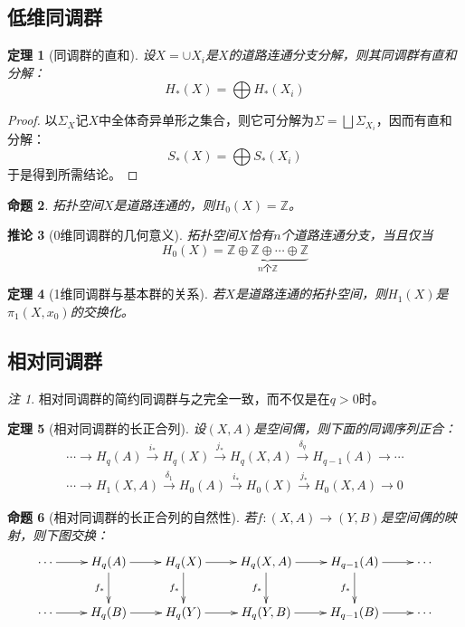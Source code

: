 \documentclass[UTF-8,11pt,fancyhdr,hyperref,titlepage]{ctexart}
\newcommand{\red}{\color{red}}
\theoremstyle{question}
\theoremstyle{theorem}
\newtheorem{thm}{定理}
\newtheorem{cor}[thm]{推论}
\newtheorem{prop}[thm]{命题}
\theoremstyle{definition}
\theoremstyle{remark}
\newtheorem*{rem}{注}
\def\ZZ{{\mathbb Z}}
\def\longto{\longrightarrow}
\def\To{\longto}
\newcommand{\markar}[1]{\stackrel{{#1}}{\longrightarrow}}%
\begin{document}
\subsection{低维同调群}
\begin{thm}[{{\red 同调群的直和}}]
  设$X=\cup X_i$是$X$的道路连通分支分解，则其同调群有直和分解：
  \begin{equation*}
    H_{\ast}(X)=\bigoplus H_{\ast}(X_i)
  \end{equation*}
\end{thm}
\begin{proof}
  以$\Sigma_X$记$X$中全体奇异单形之集合，则它可分解为$\Sigma=\bigsqcup \Sigma_{X_i}$，因而有直和分解：
  \begin{equation*}
    S_{\ast}(X)=\bigoplus S_{\ast}(X_i)
  \end{equation*}
  于是得到所需结论。
\end{proof}
\begin{prop}
  拓扑空间$X$是道路连通的，则$H_0(X)=\ZZ$。
\end{prop}
\begin{cor}[{{\red 0维同调群的几何意义}}]
  拓扑空间$X$恰有$n$个道路连通分支，当且仅当
  \begin{equation*}
  H_0(X)=\underbrace{\ZZ\oplus\ZZ\oplus\cdots\oplus\ZZ}_{n\text{个}\ZZ}
  \end{equation*}
\end{cor}

\begin{thm}[{{\red 1维同调群与基本群的关系}}]\label{H1}
  若$X$是道路连通的拓扑空间，则$H_1(X)$是$\pi_1(X,x_0)$的交换化。
\end{thm}


\subsection{相对同调群}
\begin{rem}
  相对同调群的简约同调群与之完全一致，而不仅是在$q>0$时。
\end{rem}
\begin{thm}[{{\red 相对同调群的长正合列}}]
  设$(X,A)$是空间偶，则下面的同调序列正合：
  \begin{multline*}
    \cdots\To H_q(A)\markar{i_{\ast}}H_q(X)\markar{j_{\ast}}H_q(X,A)\markar{\delta_q}H_{q-1}(A)\To\cdots \\
    \cdots\To H_1(X,A)\markar{\delta_1}H_0(A)\markar{i_{\ast}}H_0(X)\markar{j_{\ast}}H_0(X,A)\To 0
  \end{multline*}
\end{thm}
\begin{prop}[{{\red 相对同调群的长正合列的自然性}}]
  若$f\colon(X,A)\To(Y,B)$是空间偶的映射，则下图交换：
  \begin{displaymath}
  \xymatrix{
    \cdots \ar[r] & H_q(A) \ar[d]_{f_{\ast}} \ar[r] & H_q(X) \ar[d]_{f_{\ast}} \ar[r] & H_q(X,A) \ar[d]_{f_{\ast}} \ar[r] & H_{q-1}(A) \ar[d]_{f_{\ast}} \ar[r] & \cdots \\
    \cdots \ar[r] & H_q(B) \ar[r] & H_q(Y) \ar[r] & H_q(Y,B) \ar[r] & H_{q-1}(B) \ar[r] & \cdots   }
  \end{displaymath}
\end{prop}
\end{document}
